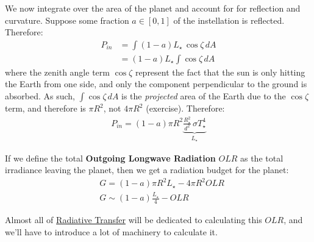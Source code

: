 We now integrate over the area of the planet and account for for reflection and curvature. Suppose some fraction $a\in[0,1]$ of the instellation is reflected. Therefore:
\begin{align*}
    P_{in}&=\int (1-a)L_\star \,\cos \zeta\,dA\\
    &=(1-a)L_\star\int \cos \zeta\,dA
\end{align*}
where the zenith angle term $\cos \zeta$ represent the fact that the sun is only hitting the Earth from one side, and only the component perpendicular to the ground is absorbed. As such, $\int\cos\zeta\, dA$ is the \textit{projected} area of the Earth due to the $\cos \zeta$ term, and therefore is $\pi R^2$, not $4\pi R^2$ (exercise). Therefore:
\begin{align}
    P_{in} = (1-a)\pi R^2 \underbrace{\frac{R_{\star}^2}{d^2}\,\sigma T_{\star}^4}_{L_\star}
\end{align}

If we define the total \textbf{Outgoing Longwave Radiation} $OLR$ as the total irradiance leaving the planet, then we get a radiation budget for the planet:
\begin{align}
   & G  = (1-a)\pi R^2 L_\star - 4\pi R^2 OLR \nonumber\\
   & \boxed{G \sim (1-a) \frac{L_\star}{4} - OLR}\label{Rad budget}
\end{align}

Almost all of \hyperref[Radiative Transfer]{Radiative Transfer} will be dedicated to calculating this $OLR$, and we'll have to introduce a lot of machinery to calculate it.

